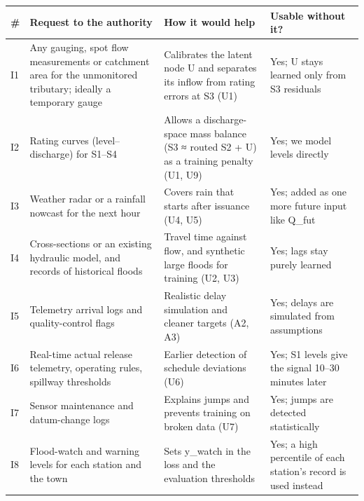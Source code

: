 \documentclass[11pt]{article}
\newcounter{none} %
\begin{document}
{\def\LTcaptype{none} %
\begin{longtable}[]{@{}
  >{\raggedright\arraybackslash}p{}
  >{\raggedright\arraybackslash}p{}
  >{\raggedright\arraybackslash}p{}
  >{\raggedright\arraybackslash}p{}@{}}
\toprule\noalign{}
\begin{minipage}[b]{\linewidth}\raggedright
\#
\end{minipage} & \begin{minipage}[b]{\linewidth}\raggedright
Request to the authority
\end{minipage} & \begin{minipage}[b]{\linewidth}\raggedright
How it would help
\end{minipage} & \begin{minipage}[b]{\linewidth}\raggedright
Usable without it?
\end{minipage} \\
\midrule\noalign{}
\endhead
\bottomrule\noalign{}
\endlastfoot
I1 & Any gauging, spot flow measurements or catchment area for the unmonitored tributary; ideally a temporary gauge & Calibrates the latent node U and separates its inflow from rating errors at S3 (U1) & Yes; U stays learned only from S3 residuals \\
I2 & Rating curves (level--discharge) for S1--S4 & Allows a discharge-space mass balance (S3 ≈ routed S2 + U) as a training penalty (U1, U9) & Yes; we model levels directly \\
I3 & Weather radar or a rainfall nowcast for the next hour & Covers rain that starts after issuance (U4, U5) & Yes; added as one more future input like Q\_fut \\
I4 & Cross-sections or an existing hydraulic model, and records of historical floods & Travel time against flow, and synthetic large floods for training (U2, U3) & Yes; lags stay purely learned \\
I5 & Telemetry arrival logs and quality-control flags & Realistic delay simulation and cleaner targets (A2, A3) & Yes; delays are simulated from assumptions \\
I6 & Real-time actual release telemetry, operating rules, spillway thresholds & Earlier detection of schedule deviations (U6) & Yes; S1 levels give the signal 10--30 minutes later \\
I7 & Sensor maintenance and datum-change logs & Explains jumps and prevents training on broken data (U7) & Yes; jumps are detected statistically \\
I8 & Flood-watch and warning levels for each station and the town & Sets y\_watch in the loss and the evaluation thresholds & Yes; a high percentile of each station's record is used instead \\
\end{longtable}
}
\end{document}
